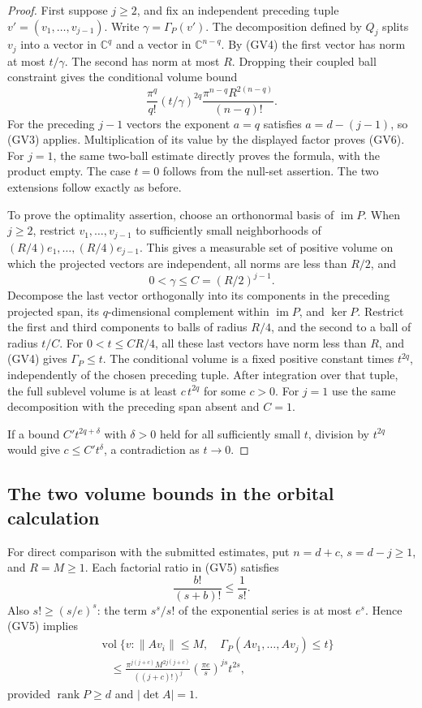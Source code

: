\begin{proof}
First suppose $j\ge2$, and fix an independent preceding tuple
$v'=(v_1,\ldots,v_{j-1})$.  Write $\gamma=\Gamma_P(v')$.
The decomposition defined by $Q_j$ splits $v_j$ into a vector
in $\mathbb C^q$ and a vector in $\mathbb C^{n-q}$.
By (GV4) the first vector has norm at most $t/\gamma$.
The second has norm at most $R$.  Dropping their coupled
ball constraint gives the conditional volume bound
\[
 \frac{\pi^q}{q!}(t/\gamma)^{2q}
       \frac{\pi^{n-q}R^{2(n-q)}}{(n-q)!}.
\]
For the preceding $j-1$ vectors the exponent $a=q$ satisfies
$a=d-(j-1)$, so (GV3) applies.  Multiplication of its value
by the displayed factor proves (GV6).  For $j=1$, the same
two-ball estimate directly proves the formula, with the
product empty.  The case $t=0$ follows from the null-set
assertion.  The two extensions follow exactly as before.

To prove the optimality assertion, choose an orthonormal
basis of $\operatorname{im}P$.  When $j\ge2$, restrict
$v_1,\ldots,v_{j-1}$ to sufficiently small neighborhoods
of $(R/4)e_1,\ldots,(R/4)e_{j-1}$.  This gives a measurable
set of positive volume on which the projected vectors are
independent, all norms are less than $R/2$, and
\[
                  0<\gamma\le C=(R/2)^{j-1}.
\]
Decompose the last vector orthogonally into its components
in the preceding projected span, its $q$-dimensional
complement within $\operatorname{im}P$, and $\ker P$.
Restrict the first and third components to balls of radius
$R/4$, and the second to a ball of radius $t/C$.  For
$0<t\le CR/4$, all these last vectors have norm less
than $R$, and (GV4) gives $\Gamma_P\le t$.
The conditional volume is a fixed positive constant times
$t^{2q}$, independently of the chosen preceding tuple.
After integration over that tuple, the full sublevel
volume is at least $c\,t^{2q}$ for some $c>0$.
For $j=1$ use the same decomposition with the preceding
span absent and $C=1$.

If a bound $C' t^{2q+\delta}$ with $\delta>0$ held for
all sufficiently small $t$, division by $t^{2q}$ would
give $c\le C't^\delta$, a contradiction as $t\to0$.
\end{proof}

\subsection{The two volume bounds in the orbital calculation}

For direct comparison with the submitted estimates, put
$n=d+c$, $s=d-j\ge1$, and $R=M\ge1$.  Each factorial
ratio in (GV5) satisfies
\[
             \frac{b!}{(s+b)!}\le\frac1{s!}.
\]
Also $s!\ge(s/e)^s$: the term $s^s/s!$ of the exponential
series is at most $e^s$.  Hence (GV5) implies
\[
 \begin{split}
 &\operatorname{vol}\{v:\|Av_i\|\le M,\quad\Gamma_P(Av_1,\ldots,Av_j)\le t\}\\
 &\quad\le
   \frac{\pi^{j(j+c)}M^{2j(j+c)}}{((j+c)!)^j}
        \left(\frac{\pi e}{s}\right)^{js}t^{2s},
                                                               \end{split}
 \tag{GV7}
\]
provided $\operatorname{rank}P\ge d$ and $|\det A|=1$.

